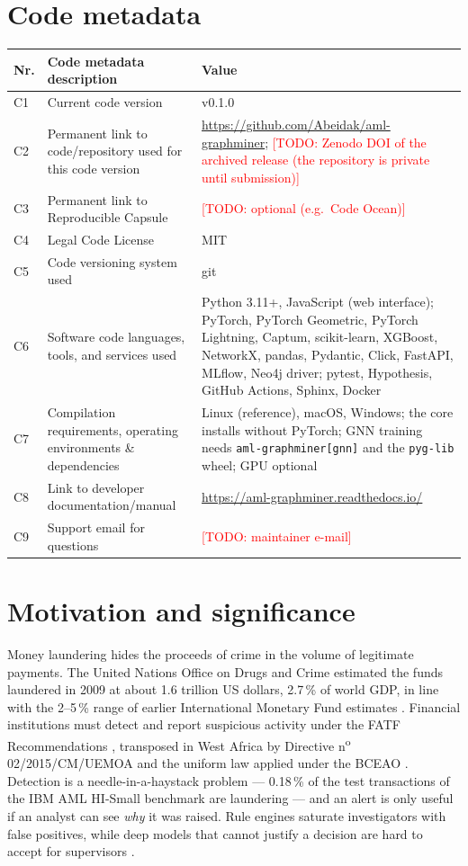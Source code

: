 \documentclass[review,12pt]{elsarticle}%
\newcommand{\todo}[1]{\textcolor{red}{[TODO: #1]}}
\begin{document}
\section*{Code metadata}
\begin{table}[h]
\centering
\small
\begin{tabular}{@{}l p{4.2cm} p{7.2cm}@{}}
\toprule
\textbf{Nr.} & \textbf{Code metadata description} & \textbf{Value} \\
\midrule
C1 & Current code version & v0.1.0 \\
C2 & Permanent link to code/repository used for this code version & \url{https://github.com/Abeidak/aml-graphminer}; \todo{Zenodo DOI of the archived release (the repository is private until submission)} \\
C3 & Permanent link to Reproducible Capsule & \todo{optional (e.g.\ Code Ocean)} \\
C4 & Legal Code License & MIT \\
C5 & Code versioning system used & git \\
C6 & Software code languages, tools, and services used & Python 3.11+, JavaScript (web interface); PyTorch, PyTorch Geometric, PyTorch Lightning, Captum, scikit-learn, XGBoost, NetworkX, pandas, Pydantic, Click, FastAPI, MLflow, Neo4j driver; pytest, Hypothesis, GitHub Actions, Sphinx, Docker \\
C7 & Compilation requirements, operating environments \& dependencies & Linux (reference), macOS, Windows; the core installs without PyTorch; GNN training needs \texttt{aml-graphminer[gnn]} and the \texttt{pyg-lib} wheel; GPU optional \\
C8 & Link to developer documentation/manual & \url{https://aml-graphminer.readthedocs.io/} \\
C9 & Support email for questions & \todo{maintainer e-mail} \\
\bottomrule
\end{tabular}
\end{table}

\section{Motivation and significance}

Money laundering hides the proceeds of crime in the volume of legitimate payments. The United
Nations Office on Drugs and Crime estimated the funds laundered in 2009 at about 1.6 trillion US
dollars, 2.7\,\% of world GDP, in line with the 2--5\,\% range of earlier International Monetary
Fund estimates \cite{unodc2011illicit}. Financial institutions must detect and report suspicious
activity under the FATF Recommendations \cite{fatf2012recommendations}, transposed in West Africa by
Directive n\textsuperscript{o}\,02/2015/CM/UEMOA and the uniform law applied under the BCEAO
\cite{uemoa2015directive}. Detection is a needle-in-a-haystack problem
--- 0.18\,\% of the test transactions of the IBM AML HI-Small benchmark are laundering
\cite{altman2023realistic} --- and an alert is only useful if an analyst can see \emph{why} it was
raised. Rule engines saturate investigators with false positives, while deep models that cannot
justify a decision are hard to accept for supervisors \cite{fatf2021newtech}.
\end{document}

